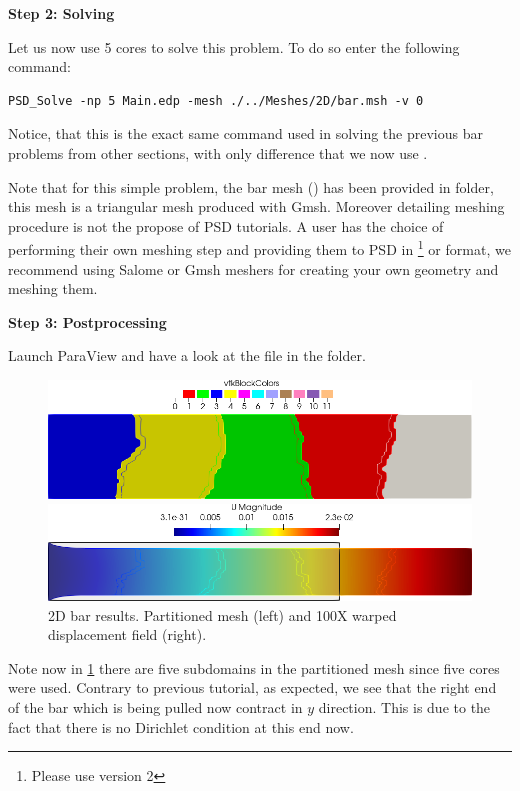 \textbf{Step 2: Solving}

Let us now use 5 cores to solve this problem. To do so enter the
following command:

\begin{lstlisting}[style=BashInputStyle]
PSD_Solve -np 5 Main.edp -mesh ./../Meshes/2D/bar.msh -v 0
\end{lstlisting}

Notice, that this is the exact same command used in solving the previous
bar problems from other sections, with only difference that we now use
.

Note that for this simple problem, the bar mesh () has been
provided in  folder, this mesh is a triangular mesh
produced with Gmsh. Moreover detailing meshing procedure is not the
propose of PSD tutorials. A user has the choice of performing their own
meshing step and providing them to PSD in
\footnote{Please use version 2} or  format, we
recommend using Salome or Gmsh meshers for creating your own geometry
and meshing them.

\textbf{Step 3: Postprocessing}

Launch ParaView and have a look at the  file in the
 folder.

\begin{figure}[htbp]
    \centering
    \begin{minipage}[t][2cm][t]{0.36\textwidth}
    \includegraphics[align=b,width=1\textwidth]{./Images/2d-bar-partitioned5.png}
    \end{minipage}\hspace{.1\textwidth}
    \begin{minipage}[t][2cm][t]{0.5\textwidth}
    \includegraphics[align=b,width=1\textwidth]{./Images/2d-bar-clamped-traction.png}
    \end{minipage}
    \caption{2D bar results. Partitioned mesh (left) and 100X warped displacement field (right).}
    \label{fig:5part}
\end{figure}

Note now in \cref{fig:5part} there are five subdomains in the
partitioned mesh since five cores were used. Contrary to previous
tutorial, as expected, we see that the right end of the bar which is
being pulled now contract in \(y\) direction. This is due to the fact
that there is no Dirichlet condition at this end now.
